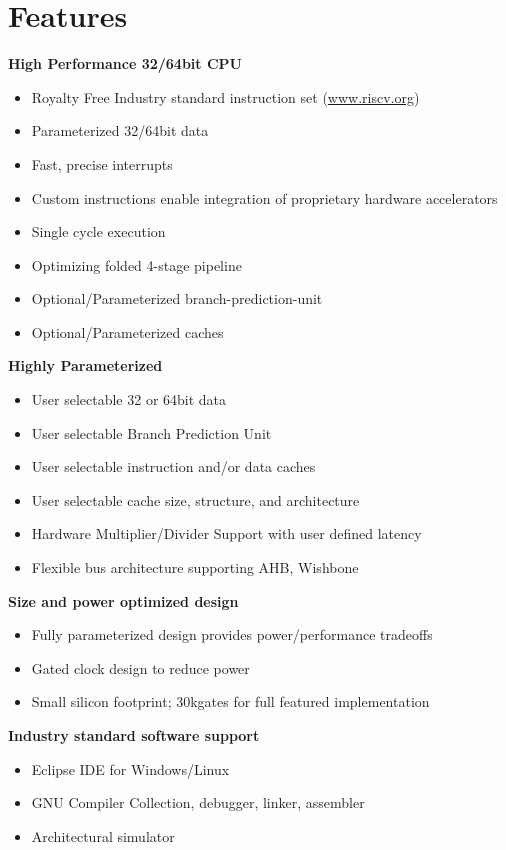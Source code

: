 \pagebreak

\section{Features}\label{features}

\textbf{High Performance 32/64bit CPU}

\begin{itemize}
\item
  Royalty Free Industry standard instruction set (\href{http://www.riscv.org}{www.riscv.org})
\item
  Parameterized 32/64bit data
\item
  Fast, precise interrupts
\item
  Custom instructions enable integration of proprietary hardware
  accelerators
\item
  Single cycle execution
\item
  Optimizing folded 4-stage pipeline
\item
  Optional/Parameterized branch-prediction-unit
\item
  Optional/Parameterized caches
\end{itemize}

\textbf{Highly Parameterized}

\begin{itemize}
\item
  User selectable 32 or 64bit data
\item
  User selectable Branch Prediction Unit
\item
  User selectable instruction and/or data caches
\item
  User selectable cache size, structure, and architecture
\item
  Hardware Multiplier/Divider Support with user defined latency
\item
  Flexible bus architecture supporting AHB, Wishbone
\end{itemize}

\textbf{Size and power optimized design}

\begin{itemize}
\item
  Fully parameterized design provides power/performance tradeoffs
\item
  Gated clock design to reduce power
\item
  Small silicon footprint; 30kgates for full featured implementation
\end{itemize}

\textbf{Industry standard software support}

\begin{itemize}
\item
  Eclipse IDE for Windows/Linux
\item
  GNU Compiler Collection, debugger, linker, assembler
\item
  Architectural simulator
\end{itemize}
